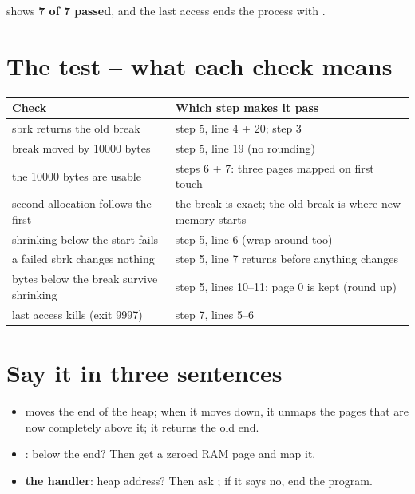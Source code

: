 \documentclass[11pt]{report}
\newcommand{\done}[1]{\begin{keybox}[title={Done when}]#1\end{keybox}}
\begin{document}
\done{ shows \textbf{7 of 7 passed}, and the last access ends the process with
\code{exit\_code: 9997}.}

\section*{The test -- what each check means}

\begin{tabular}{@{}L{6.6cm} L{8.6cm}@{}}
\toprule
\textbf{Check} & \textbf{Which step makes it pass}\\\midrule
sbrk returns the old break & step 5, line 4 + 20; step 3 \\
break moved by 10000 bytes & step 5, line 19 (no rounding)\\
the 10000 bytes are usable & steps 6 + 7: three pages mapped on first touch\\
second allocation follows the first & the break is exact; the old break is where new memory starts\\
shrinking below the start fails & step 5, line 6 (wrap-around too)\\
a failed sbrk changes nothing & step 5, line 7 returns before anything changes\\
bytes below the break survive shrinking & step 5, lines 10--11: page 0 is kept (round up)\\
last access kills (exit 9997) & step 7, lines 5--6\\
\bottomrule
\end{tabular}

\section*{Say it in three sentences}

\begin{keybox}[title={Remember}]
\begin{itemize}
  \item \textbf{} moves the end of the heap; when it moves down, it unmaps the pages that are
        now completely above it; it returns the old end.
  \item \textbf{}: below the end? Then get a zeroed RAM page and map it.
  \item \textbf{the handler}: heap address? Then ask ; if it says no, end the program.
\end{itemize}
\end{keybox}
\end{document}
